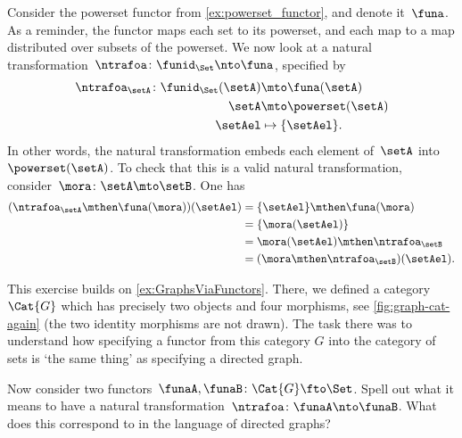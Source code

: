 \begin{example}
    Consider the powerset functor from \cref{ex:powerset_functor}, and denote it~$\funa$.
    As a reminder, the functor maps each set to its powerset, and each map to a map distributed over subsets of the powerset.
    We now look at a natural transformation~$\ntrafoa\colon \funid_\Set \nto \funa$, specified by
    \begin{equation*}
        \begin{aligned}
            \ntrafoa_\setA\colon \funid_\Set(\setA) &\mto \funa(\setA)\\
            \setA&\mto \powerset(\setA)\\
            \setAel &\mapsto \{\setAel\}.
        \end{aligned}
    \end{equation*}
    In other words, the natural transformation embeds each element of~$\setA$ into~$\powerset(\setA)$.
    To check that this is a valid natural transformation, consider~$\mora\colon \setA\mto \setB$. One has
    \begin{equation*}
        \begin{aligned}
        (\ntrafoa_\setA \mthen \funa(\mora))(\setAel)
            &=\{\setAel\} \mthen \funa(\mora)\\
            &=\{\mora(\setAel)\}\\
            &=\mora(\setAel)\mthen \ntrafoa_\setB\\
            &=(\mora \mthen \ntrafoa_\setB)(\setAel).
        \end{aligned}
    \end{equation*}
\end{example}


\begin{gradedexercise}
    \label{ex:NatTrafosGraphs}
    This exercise builds on \cref{ex:GraphsViaFunctors}.
    There, we defined a category~$\Cat{G}$ which has precisely two objects and four morphisms, see \cref{fig:graph-cat-again} (the two identity morphisms are not drawn). The task there was to understand how specifying a functor from this category $G$ into the category of sets is `the same thing' as specifying a directed graph.
    
    Now consider two functors~$\funaA, \funaB \colon \Cat{G} \fto \Set$. Spell out what it means to have a natural transformation~$\ntrafoa\colon \funaA \nto \funaB$. What does this correspond to in the language of directed graphs?
\end{gradedexercise}

